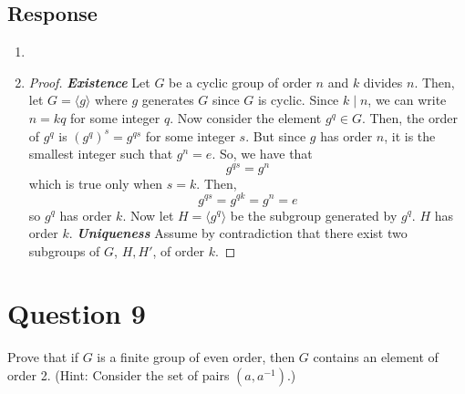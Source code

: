 \documentclass[13pt]{article}
\begin{document}
\subsection*{Response}
\begin{enumerate}[label=(\alph*)]
    \item 
    \item 
        \begin{proof}
            \textit{\textbf{Existence}}
            \newline
            Let $G$ be a cyclic group of order $n$ and $k$ divides $n$. Then, 
            let $G = \langle g \rangle$ where $g$ generates $G$ since $G$ is cyclic.
            Since $k \mid n$, we can write $n = kq$ for some integer $q$. Now consider 
            the element $g^q \in G$. Then, the order of $g^q$ is 
            $\left(g^q\right)^s = g^{qs}$ for some integer $s$. But since $g$ has order $n$,
            it is the smallest integer such that $g^n = e$. So, we have that
            \[g^{qs} = g^n\]
            which is true only when $s = k$. Then,
            \[g^{qs} = g^{qk} = g^n = e\]
            so $g^q$ has order $k$. Now let $H = \langle g^q \rangle$ be the subgroup
            generated by $g^q$. $H$ has order $k$.
            \newline
            \newline
            \textit{\textbf{Uniqueness}}
            \newline
            Assume by contradiction that there exist two subgroups of $G$, $H, H'$, 
            of order $k$. 
        \end{proof}
\end{enumerate}





\newpage
\section*{Question 9}
Prove that if $G$ is a finite group of even order, then $G$ contains an element of order 2. (Hint:
Consider the set of pairs $(a, a^{-1})$.)
\end{document}
